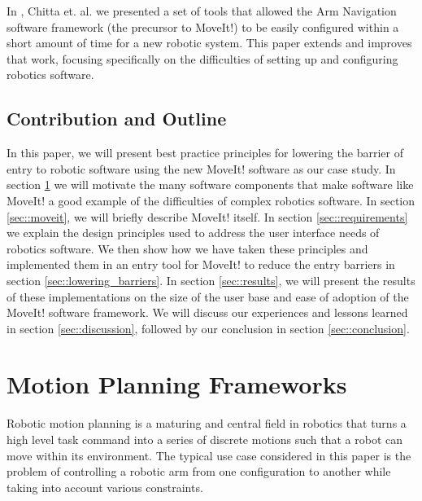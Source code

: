 \documentclass[10pt,journal,compsoc]{joser1}
\begin{document}
{In \cite{chitta2012perception}, Chitta et. al. we presented a set of tools that allowed the Arm Navigation software framework (the precursor to MoveIt!) to be easily configured within a short amount of time for a new robotic system. This paper extends and improves that work, focusing specifically on the difficulties of setting up and configuring robotics software.

\subsection{Contribution and Outline}

In this paper, we will present best practice principles for lowering the barrier of entry to robotic software using the new MoveIt! software \cite{moveit} as our case study. In section \ref{sec::motion_planning} we will motivate the many software components that make software like MoveIt! a good example of the difficulties of complex robotics software. In section \ref{sec::moveit}, we will briefly describe MoveIt! itself. In section \ref{sec::requirements} we explain the design principles used to address the user interface needs of robotics software. We then show how we have taken these principles and implemented them in an entry tool for MoveIt! to reduce the entry barriers in section \ref{sec::lowering_barriers}. In section \ref{sec::results}, we will present the results of these implementations on the size of the user base and ease of adoption of the MoveIt! software framework. We will discuss our experiences and lessons learned in section \ref{sec::discussion}, followed by our conclusion in section \ref{sec::conclusion}.

\section{Motion Planning Frameworks}
\label{sec::motion_planning}

Robotic motion planning is a maturing and central field in robotics \cite{moll2011teaching} that turns a high level task command into a series of discrete motions such that a robot can move within its environment. The typical use case considered in this paper is the problem of controlling a robotic arm from one configuration to another while taking into account various constraints.

}
\end{document}
